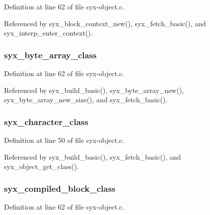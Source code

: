 Definition at line 62 of file syx-object.c.

Referenced by syx\_\-block\_\-context\_\-new(), syx\_\-fetch\_\-basic(), and syx\_\-interp\_\-enter\_\-context().\hypertarget{syx-object_8c_b692d37a746506811e13db448cc5f10a}{
\subsubsection{ {\bf syx\_\-byte\_\-array\_\-class}}}
\label{syx-object_8c_b692d37a746506811e13db448cc5f10a}




Definition at line 62 of file syx-object.c.

Referenced by syx\_\-build\_\-basic(), syx\_\-byte\_\-array\_\-new(), syx\_\-byte\_\-array\_\-new\_\-size(), and syx\_\-fetch\_\-basic().\hypertarget{syx-object_8c_be9354d970faef793af7e85246dd2ef8}{
\subsubsection{ {\bf syx\_\-character\_\-class}}}
\label{syx-object_8c_be9354d970faef793af7e85246dd2ef8}




Definition at line 50 of file syx-object.c.

Referenced by syx\_\-build\_\-basic(), syx\_\-fetch\_\-basic(), and syx\_\-object\_\-get\_\-class().\hypertarget{syx-object_8c_f43d738ba7c8d9abc962067fb526cedd}{
\subsubsection{ {\bf syx\_\-compiled\_\-block\_\-class}}}
\label{syx-object_8c_f43d738ba7c8d9abc962067fb526cedd}




Definition at line 62 of file syx-object.c.

